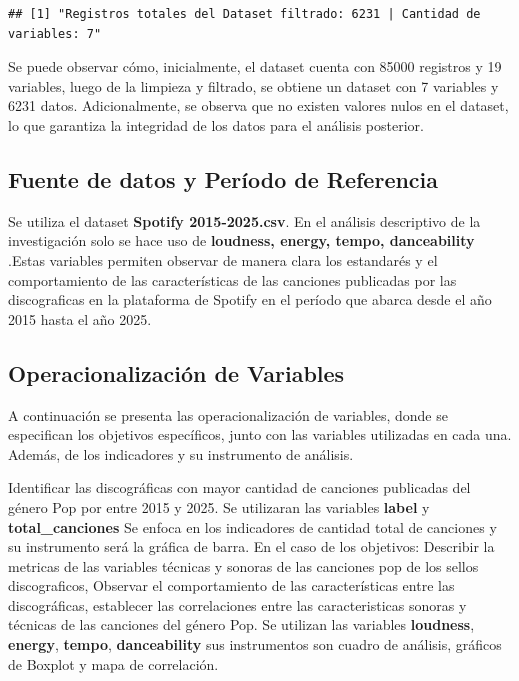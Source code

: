 \documentclass[oneside,11pt]{Latex/Classes/PhDthesisPSnPDF}
\begin{document}
\begin{verbatim}
## [1] "Registros totales del Dataset filtrado: 6231 | Cantidad de variables: 7"
\end{verbatim}

Se puede observar cómo, inicialmente, el dataset cuenta con 85000
registros y 19 variables, luego de la limpieza y filtrado, se obtiene un
dataset con 7 variables y 6231 datos. Adicionalmente, se observa que no
existen valores nulos en el dataset, lo que garantiza la integridad de
los datos para el análisis posterior.\\

\subsection{Fuente de datos y Período de Referencia}

Se utiliza el dataset \textbf{Spotify 2015-2025.csv}. En el análisis
descriptivo de la investigación solo se hace uso de \textbf{loudness,
energy, tempo, danceability} .Estas variables permiten observar de
manera clara los estandarés y el comportamiento de las características
de las canciones publicadas por las discograficas en la plataforma de
Spotify en el período que abarca desde el año 2015 hasta el año 2025.\\

\subsection{Operacionalización de Variables}

A continuación se presenta las operacionalización de variables, donde se
especifican los objetivos específicos, junto con las variables
utilizadas en cada una. Además, de los indicadores y su instrumento de
análisis.

Identificar las discográficas con mayor cantidad de canciones publicadas
del género Pop por entre 2015 y 2025. Se utilizaran las variables
\textbf{label} y \textbf{total\_canciones} Se enfoca en los indicadores
de cantidad total de canciones y su instrumento será la gráfica de
barra. En el caso de los objetivos: Describir la metricas de las
variables técnicas y sonoras de las canciones pop de los sellos
discograficos, Observar el comportamiento de las características entre
las discográficas, establecer las correlaciones entre las
caracteristicas sonoras y técnicas de las canciones del género Pop. Se
utilizan las variables \textbf{loudness}, \textbf{energy},
\textbf{tempo}, \textbf{danceability} sus instrumentos son cuadro de
análisis, gráficos de Boxplot y mapa de correlación.
\end{document}
